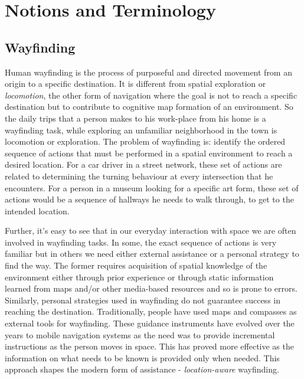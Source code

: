 \documentclass{iitkthesis}
\begin{document}
\section{Notions and Terminology}
\subsection{Wayfinding}
Human wayfinding is the process of purposeful and directed movement from 
an origin to a specific destination. It is different from spatial 
exploration or \textit{locomotion}, the other form of navigation where 
the goal is not to reach a specific destination but to contribute to 
cognitive map formation of an environment. So the daily trips that a 
person makes to his work-place from his home is a wayfinding task, while 
exploring an unfamiliar neighborhood in the town is locomotion or 
exploration. The problem of wayfinding is: identify the ordered 
sequence of actions that must be performed in a spatial environment to reach 
a desired location. For a car driver in a street network, these set of 
actions are related to determining the turning behaviour at every 
intersection that he encounters. For a person in a museum looking for a 
specific art form, these set of actions would be a sequence of hallways 
he needs to walk through, to get to the intended location. 

Further, it's easy to see that in our everyday interaction with space 
we are often involved in wayfinding tasks. In some, the exact sequence of 
actions is very familiar but in 
others we need either external assistance or a personal strategy to 
find the way. The former requires acquisition of spatial knowledge 
of the environment either through prior experience or through static 
information learned from maps and/or other media-based resources and so 
is prone to errors. Similarly, personal strategies used in wayfinding do 
not guarantee success in reaching the destination. Traditionally, 
people have used maps and compasses as external tools for 
wayfinding. These guidance instruments have evolved over the years to 
mobile navigation systems as the need was to provide incremental 
instructions as the person moves in space. This has 
proved more effective as the information on what needs to be known 
is provided only when needed. This approach shapes the 
modern form of assistance - \textit{location-aware} wayfinding. 
\end{document}
